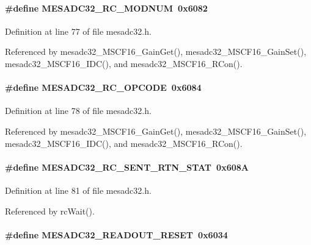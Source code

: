 \paragraph[{MESADC32\_\-RC\_\-MODNUM}]{\setlength{\rightskip}{0pt plus 5cm}\#define MESADC32\_\-RC\_\-MODNUM~0x6082}\hfill\label{mesadc32_8h_a946de7c7066c6ff911c5468b24078428}


Definition at line 77 of file mesadc32.h.

Referenced by mesadc32\_\-MSCF16\_\-GainGet(), mesadc32\_\-MSCF16\_\-GainSet(), mesadc32\_\-MSCF16\_\-IDC(), and mesadc32\_\-MSCF16\_\-RCon().
\paragraph[{MESADC32\_\-RC\_\-OPCODE}]{\setlength{\rightskip}{0pt plus 5cm}\#define MESADC32\_\-RC\_\-OPCODE~0x6084}\hfill\label{mesadc32_8h_a7a50021f1dbe169d840a2a39009e5a54}


Definition at line 78 of file mesadc32.h.

Referenced by mesadc32\_\-MSCF16\_\-GainGet(), mesadc32\_\-MSCF16\_\-GainSet(), mesadc32\_\-MSCF16\_\-IDC(), and mesadc32\_\-MSCF16\_\-RCon().
\paragraph[{MESADC32\_\-RC\_\-SENT\_\-RTN\_\-STAT}]{\setlength{\rightskip}{0pt plus 5cm}\#define MESADC32\_\-RC\_\-SENT\_\-RTN\_\-STAT~0x608A}\hfill\label{mesadc32_8h_ac9faa367963b112aab6aac1b0154d726}


Definition at line 81 of file mesadc32.h.

Referenced by rcWait().
\paragraph[{MESADC32\_\-READOUT\_\-RESET}]{\setlength{\rightskip}{0pt plus 5cm}\#define MESADC32\_\-READOUT\_\-RESET~0x6034}\hfill\label{mesadc32_8h_aa3845bf3a289cc8f1d5a7929a374b303}


